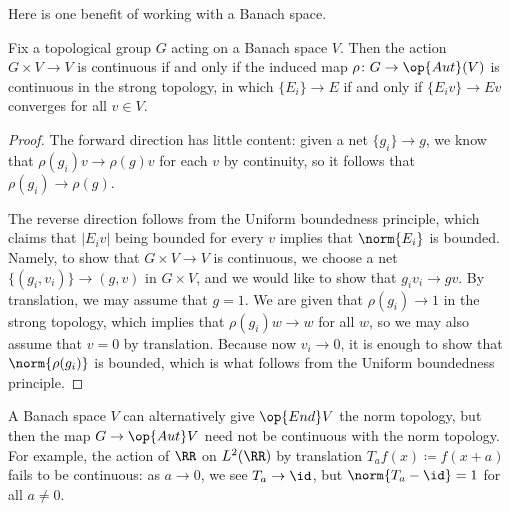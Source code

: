 \documentclass[../notes.tex]{subfiles}
\begin{document}
Here is one benefit of working with a Banach space.
\begin{lemma} \label{lem:banach-has-cont-action-map}
	Fix a topological group $G$ acting on a Banach space $V$. Then the action $G\times V\to V$ is continuous if and only if the induced map $\rho\colon G\to\op{Aut}(V)$ is continuous in the strong topology, in which $\{E_i\}\to E$ if and only if $\{E_iv\}\to Ev$ converges for all $v\in V$.
\end{lemma}
\begin{proof}
	The forward direction has little content: given a net $\{g_i\}\to g$, we know that $\rho(g_i)v\to\rho(g)v$ for each $v$ by continuity, so it follows that $\rho(g_i)\to\rho(g)$.
	
	The reverse direction follows from the Uniform boundedness principle, which claims that $\left|E_iv\right|$ being bounded for every $v$ implies that $\norm{E_i}$ is bounded. Namely, to show that $G\times V\to V$ is continuous, we choose a net $\{(g_i,v_i)\}\to (g,v)$ in $G\times V$, and we would like to show that $g_iv_i\to gv$. By translation, we may assume that $g=1$. We are given that $\rho(g_i)\to1$ in the strong topology, which implies that $\rho(g_i)w\to w$ for all $w$, so we may also assume that $v=0$ by translation. Because now $v_i\to0$, it is enough to show that $\norm{\rho(g_i)}$ is bounded, which is what follows from the Uniform boundedness principle.
\end{proof}
\begin{remark}
	A Banach space $V$ can alternatively give $\op{End}V$ the norm topology, but then the map $G\to\op{Aut}V$ need not be continuous with the norm topology. For example, the action of $\RR$ on $L^2(\RR)$ by translation $T_af(x)\coloneqq f(x+a)$ fails to be continuous: as $a\to0$, we see $T_a\to\id$, but $\norm{T_a-\id}=1$ for all $a\ne0$.
\end{remark}
\end{document}
